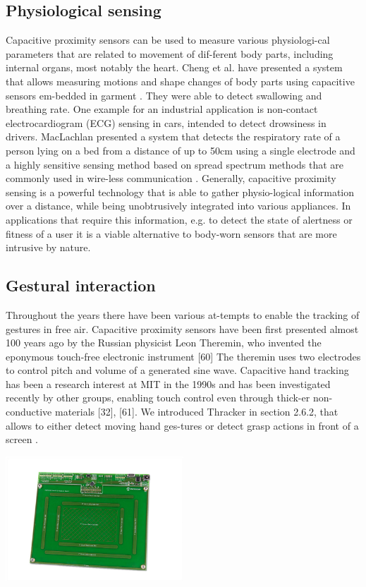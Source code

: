 \subsection{Physiological sensing}
Capacitive proximity sensors can be used to measure various physiologi-cal parameters that are related to movement of dif-ferent body parts, including internal organs, most notably the heart. Cheng et al. have presented a system that allows measuring motions and shape changes of body parts using capacitive sensors em-bedded in garment \cite{cheng2010active}. They were able to detect swallowing and breathing rate. One example for an industrial application is non-contact electrocardiogram (ECG) sensing in cars, intended to detect drowsiness in drivers. MacLachlan presented a system that detects the respiratory rate of a person lying on a bed from a distance of up to 50cm using a single electrode and a highly sensitive sensing method based on spread spectrum methods that are commonly used in wire-less communication \cite{MacLachlan2004}.
Generally, capacitive proximity sensing is a powerful technology that is able to gather physio-logical information over a distance, while being unobtrusively integrated into various appliances. In applications that require this information, e.g. to detect the state of alertness or fitness of a user it is a viable alternative to body-worn sensors that are more intrusive by nature. \subsection{Gestural interaction}
Throughout the years there have been various at-tempts to enable the tracking of gestures in free air. Capacitive proximity sensors have been first presented almost 100 years ago by the Russian physicist Leon Theremin, who invented the eponymous touch-free electronic instrument [60] The theremin uses two electrodes to control pitch and volume of a generated sine wave. Capacitive hand tracking has been a research interest at MIT in the 1990s \cite{Smith1999a} and has been investigated recently by other groups, enabling touch control even through thick-er non-conductive materials [32], [61]. 
We introduced Thracker in section 2.6.2, that allows to either detect moving hand ges-tures or detect grasp actions in front of a screen  \cite{Wimmer2006}.

\begin{minipage}{\linewidth}
\centering
\includegraphics[width=0.5\textwidth]{images/gestic}
\label{fig:prot_rel_gestic}
\end{minipage}

